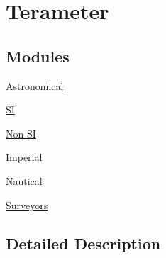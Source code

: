 \hypertarget{group___e_g_x_math-_conversions-_length_conversions-_s_i-_terameter}{}\section{Terameter}
\label{group___e_g_x_math-_conversions-_length_conversions-_s_i-_terameter}
\subsection*{Modules}
\begin{DoxyCompactItemize}
\item 
\mbox{\hyperlink{group___e_g_x_math-_conversions-_length_conversions-_s_i-_terameter-_astronomical}{Astronomical}}
\item 
\mbox{\hyperlink{group___e_g_x_math-_conversions-_length_conversions-_s_i-_terameter-_s_i}{SI}}
\item 
\mbox{\hyperlink{group___e_g_x_math-_conversions-_length_conversions-_s_i-_terameter-_non-_s_i}{Non-\/\+SI}}
\item 
\mbox{\hyperlink{group___e_g_x_math-_conversions-_length_conversions-_s_i-_terameter-_imperial}{Imperial}}
\item 
\mbox{\hyperlink{group___e_g_x_math-_conversions-_length_conversions-_s_i-_terameter-_nautical}{Nautical}}
\item 
\mbox{\hyperlink{group___e_g_x_math-_conversions-_length_conversions-_s_i-_terameter-_surveyors}{Surveyors}}
\end{DoxyCompactItemize}


\subsection{Detailed Description}
